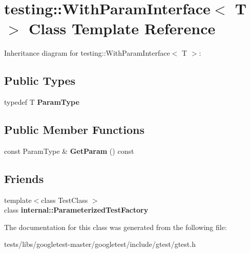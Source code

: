 \hypertarget{classtesting_1_1WithParamInterface}{}\section{testing\+:\+:With\+Param\+Interface$<$ T $>$ Class Template Reference}
\label{classtesting_1_1WithParamInterface}


Inheritance diagram for testing\+:\+:With\+Param\+Interface$<$ T $>$\+:
\subsection*{Public Types}
\begin{DoxyCompactItemize}
\item 
\mbox{\label{classtesting_1_1WithParamInterface_a343febaaebf1f025bda484f841d4fec1}} 
typedef T {\bfseries Param\+Type}
\end{DoxyCompactItemize}
\subsection*{Public Member Functions}
\begin{DoxyCompactItemize}
\item 
\mbox{\label{classtesting_1_1WithParamInterface_aa7b9028f06ee7ec1174bb25317b07eb2}} 
const Param\+Type \& {\bfseries Get\+Param} () const
\end{DoxyCompactItemize}
\subsection*{Friends}
\begin{DoxyCompactItemize}
\item 
\mbox{\label{classtesting_1_1WithParamInterface_a7543eb7df89f00fff517dba24bc11dd5}} 
{\footnotesize template$<$class Test\+Class $>$ }\\class {\bfseries internal\+::\+Parameterized\+Test\+Factory}
\end{DoxyCompactItemize}


The documentation for this class was generated from the following file\+:\begin{DoxyCompactItemize}
\item 
tests/libs/googletest-\/master/googletest/include/gtest/gtest.\+h\end{DoxyCompactItemize}
